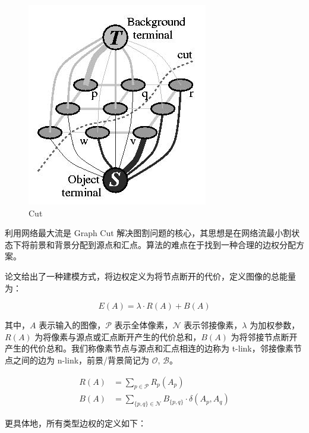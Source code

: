 \documentclass[lang=cn,11pt,a4paper]{elegantpaper}
\begin{document}
\begin{figure}[ht]
\begin{minipage}{0.25\linewidth}
		\includegraphics[width=0.8 \linewidth]{image/graph_cut_pic2.jpg}
		\caption{Cut}
	\end{minipage}
\end{figure}

利用网络最大流是 Graph Cut 解决图割问题的核心，其思想是在网络流最小割状态下将前景和背景分配到源点和汇点。算法的难点在于找到一种合理的边权分配方案。

论文给出了一种建模方式，将边权定义为将节点断开的代价，定义图像的总能量为：

\begin{equation}
E(A)=\lambda \cdot R(A)+B(A)
\end{equation}

其中，$A$ 表示输入的图像，$\mathcal{P}$ 表示全体像素，$\mathcal{N}$ 表示邻接像素，$\lambda$ 为加权参数，$R(A)$ 为将像素与源点或汇点断开产生的代价总和，$B(A)$ 为将邻接节点断开产生的代价总和。我们称像素节点与源点和汇点相连的边称为 t-link，邻接像素节点之间的边为 n-link，前景/背景简记为 $\mathcal{O}$, $\mathcal{B}$。

\begin{align}
R(A) & = \sum_{p \in \mathcal{P}} R_{p}\left(A_{p}\right) \\
B(A) & = \sum_{\{p, q\} \in \mathcal{N}} B_{\{p, q\}} \cdot \delta\left(A_{p}, A_{q}\right)
\end{align}

更具体地，所有类型边权的定义如下：
\end{document}
